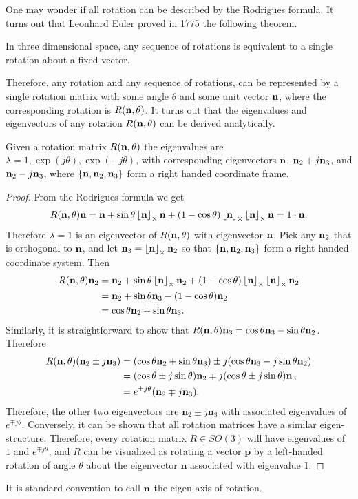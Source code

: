 One may wonder if all rotation can be described by the Rodrigues formula.  It turns out that Leonhard Euler proved in 1775 the following theorem.
\begin{theorem}
	In three dimensional space, any sequence of rotations is equivalent to a single rotation about a fixed vector.
\end{theorem}
Therefore, any rotation and any sequence of rotations, can be represented by a single rotation matrix with some angle $\theta$ and some unit vector $\mathbf{n}$, where the corresponding rotation is $R(\mathbf{n},\theta)$.
It turns out that the eigenvalues and eigenvectors of any rotation $R(\mathbf{n},\theta)$ can be derived analytically.
\begin{lemma}
Given a rotation matrix $R(\mathbf{n},\theta)$ the eigenvalues are $\lambda=1, \exp(j\theta), \exp(-j\theta)$, with corresponding eigenvectors
$\mathbf{n}$, $\mathbf{n}_2+j\mathbf{n}_3$, and $\mathbf{n}_2-j\mathbf{n}_3$, where $\{\mathbf{n}, \mathbf{n}_2, \mathbf{n}_3\}$ form a right handed coordinate frame.
\end{lemma}
\begin{proof}
From the Rodrigues formula we get
\[
R(\mathbf{n},\theta)\mathbf{n} = \mathbf{n} + \sin\theta \left\lfloor\mathbf{n}\right\rfloor_{\times}\mathbf{n} + (1-\cos\theta)\left\lfloor\mathbf{n}\right\rfloor_{\times}\left\lfloor\mathbf{n}\right\rfloor_{\times}\mathbf{n}
                   = 1\cdot\mathbf{n}.
\]
Therefore $\lambda=1$ is an eigenvector of $R(\mathbf{n},\theta)$ with eigenvector $\mathbf{n}$.  Pick any $\mathbf{n}_2$ that is orthogonal to $\mathbf{n}$, and let $\mathbf{n}_3=\left\lfloor\mathbf{n}\right\rfloor_{\times}\mathbf{n}_2$ so that $\{\mathbf{n}, \mathbf{n}_2, \mathbf{n}_3\}$ form a right-handed coordinate system.  Then
\begin{align*}
	R(\mathbf{n},\theta)\mathbf{n}_2 &= \mathbf{n}_2 + \sin\theta \left\lfloor\mathbf{n}\right\rfloor_{\times}\mathbf{n}_2 + (1-\cos\theta)\left\lfloor\mathbf{n}\right\rfloor_{\times}\left\lfloor\mathbf{n}\right\rfloor_{\times}\mathbf{n}_2 \\
	&= \mathbf{n}_2 + \sin\theta \mathbf{n}_3 - (1-\cos\theta)\mathbf{n}_2 \\
	&= \cos\theta \mathbf{n}_2 + \sin\theta \mathbf{n}_3.
\end{align*}
Similarly, it is straightforward to show that $R(\mathbf{n},\theta)\mathbf{n}_3 = \cos\theta \mathbf{n}_3 - \sin\theta \mathbf{n}_2$.  Therefore
\begin{align*}
	R(\mathbf{n},\theta)(\mathbf{n}_2 \pm j\mathbf{n}_3) &= (\cos\theta\mathbf{n}_2 + \sin\theta\mathbf{n}_3) \pm j(\cos\theta \mathbf{n}_3 - j\sin\theta\mathbf{n}_2) \\
		&= (\cos\theta \pm j\sin\theta)\mathbf{n}_2 \mp j(\cos\theta \pm j\sin\theta)\mathbf{n}_3 \\
		&= e^{\pm j\theta} (\mathbf{n}_2 \mp j\mathbf{n}_3).
\end{align*}
Therefore, the other two eigenvectors are $\mathbf{n}_2\pm j\mathbf{n}_3$ with associated eigenvalues of $e^{\mp j\theta}$.  
Conversely, it can be shown that all rotation matrices have a similar eigen-structure.  Therefore, every rotation matrix $R\in SO(3)$ will have eigenvalues of $1$ and $e^{\mp j\theta}$, and $R$ can be visualized as rotating a vector $\mathbf{p}$ by a left-handed rotation of angle $\theta$ about the eigenvector $\mathbf{n}$ associated with eigenvalue $1$. 
\end{proof}
It is standard convention to call $\mathbf{n}$ the eigen-axis of rotation.  

